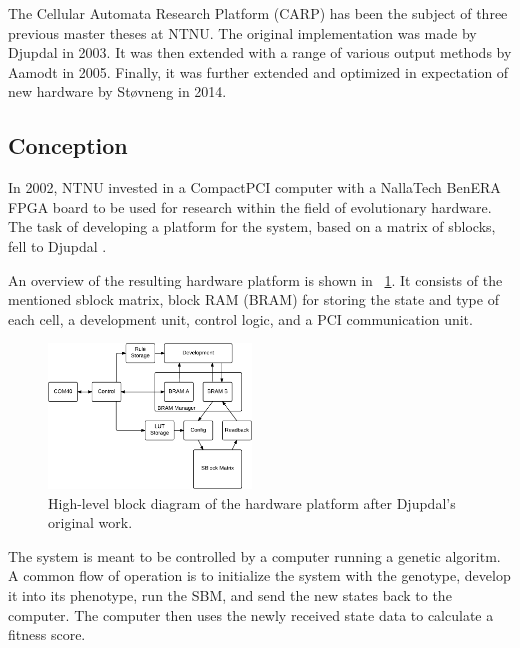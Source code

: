 The Cellular Automata Research Platform (CARP) has been the subject of three previous master theses at NTNU.
The original implementation was made by Djupdal in 2003.
It was then extended with a range of various output methods by Aamodt in 2005.
Finally, it was further extended and optimized in expectation of new hardware by Støvneng in 2014.

\subsection{Conception}

In 2002, NTNU invested in a CompactPCI computer with a NallaTech BenERA FPGA board to be used for research within the field of evolutionary hardware.
The task of developing a platform for the system, based on a matrix of sblocks, fell to Djupdal \cite{djupdal2003sblock}.

An overview of the resulting hardware platform is shown in \figurename~\ref{fig:overview-djupdal}.
It consists of the mentioned sblock matrix, block RAM (BRAM) for storing the state and type of each cell, a development unit, control logic, and a PCI communication unit.

\begin{figure}[!ht]
    \centering
    \includegraphics[width=0.48\textwidth]{figures/overview-djupdal}
    \caption{High-level block diagram of the hardware platform after Djupdal's original work.}
    \label{fig:overview-djupdal}
\end{figure}

The system is meant to be controlled by a computer running a genetic algoritm.
A common flow of operation is to initialize the system with the genotype, develop it into its phenotype, run the SBM, and send the new states back to the computer.
The computer then uses the newly received state data to calculate a fitness score.

